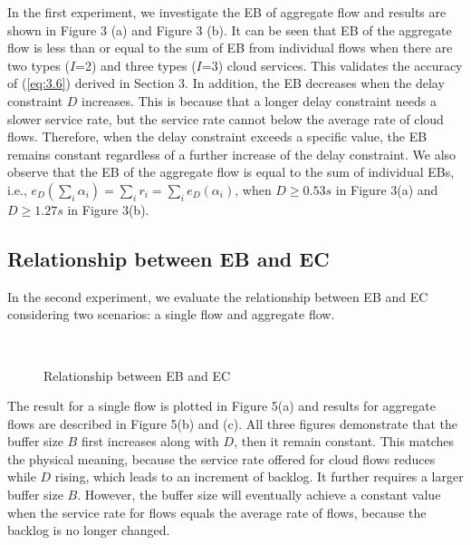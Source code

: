 \documentclass[a4paper]{article}
\begin{document}
In the first experiment, we investigate the EB of aggregate flow and results are shown in Figure 3 (a) and Figure 3 (b). It can be seen that EB of the aggregate flow is less than or equal to the sum of EB from individual flows when there are two types ($I$=2) and three types ($I$=3) cloud services. This validates the accuracy of (\ref{eq:3.6}) derived in Section 3. In addition, the EB decreases when the delay constraint $D$ increases. This is because that a longer delay constraint needs a slower service rate, but the service rate cannot below the average rate of cloud flows. Therefore, when the delay constraint exceeds a specific value, the EB remains constant regardless of a further increase of the delay constraint. We also observe that the EB of the aggregate flow is equal to the sum of individual EBs, i.e., ${e_D}(\sum\nolimits_i {{\alpha _i}} ) = \sum\nolimits_i {{r_i}}  = \sum\nolimits_i {{e_D}({\alpha _i})}$, when $D \ge 0.53s$ in Figure 3(a) and $D \ge 1.27s$ in Figure 3(b).

\subsection{Relationship between EB and EC}

In the second experiment, we evaluate the relationship between EB and EC considering two scenarios: a single flow and aggregate flow.

\begin{figure}[h]
  \centering
  \\
  \caption{Relationship between EB and EC}
  \label{fig4}
\end{figure}

The result for a single flow is plotted in Figure 5(a) and results for aggregate flows are described in Figure 5(b) and (c). All three figures demonstrate that the buffer size $B$ first increases along with $D$, then it remain constant. This matches the physical meaning, because the service rate offered for cloud flows reduces while $D$ rising, which leads to an increment of backlog. It further requires a larger buffer size $B$. However, the buffer size will eventually achieve a constant value when the service rate for flows equals the average rate of flows, because the backlog is no longer changed.
\end{document}

